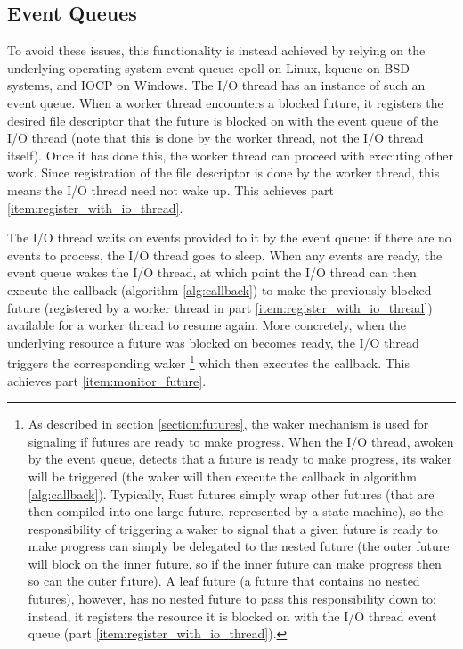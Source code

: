 \documentclass[bsc,frontabs,singlespacing,parskip,deptreport,normalheadings]{infthesis}
\begin{document}
\subsection{Event Queues}
\label{subsection:event_queues}

To avoid these issues, this functionality is instead achieved by relying on the
underlying operating system event queue: epoll on Linux, kqueue on BSD systems,
and IOCP on Windows. The I/O thread has an instance of such an event queue. When
a worker thread encounters a blocked future, it registers the desired file
descriptor that the future is blocked on with the event queue of the I/O thread
(note that this is done by the worker thread, not the I/O thread itself). Once
it has done this, the worker thread can proceed with executing other work. Since
registration of the file descriptor is done by the worker thread, this means the
I/O thread need not wake up. This achieves part
\ref{item:register_with_io_thread}.

The I/O thread waits on events provided to it by the event queue: if there are
no events to process, the I/O thread goes to sleep. When any events are ready,
the event queue wakes the I/O thread, at which point the I/O thread can then
execute the callback (algorithm \ref{alg:callback}) to make the previously
blocked future (registered by a worker thread in part
\ref{item:register_with_io_thread}) available for a worker thread to resume
again. More concretely, when the underlying resource a future was blocked on
becomes ready, the I/O thread triggers the corresponding waker \footnote{ As
    described in section \ref{section:futures}, the waker mechanism
    is used for signaling if futures are ready to make progress. When the I/O
    thread, awoken by the event queue, detects that a future is ready to make
    progress, its waker will be triggered (the waker will then execute the
    callback in algorithm \ref{alg:callback}). Typically, Rust futures simply
    wrap other futures (that are then compiled into one large future,
    represented by a state machine), so the responsibility of triggering a waker
    to signal that a given future is ready to make progress can simply be
    delegated to the nested future (the outer future will block on the inner
    future, so if the inner future can make progress then so can the outer
    future). A leaf future (a future that contains no nested futures), however,
has no nested future to pass this responsibility down to: instead, it registers
the resource it is blocked on with the I/O thread event queue (part
\ref{item:register_with_io_thread}).} which then executes the callback. This
achieves part \ref{item:monitor_future}.
\end{document}
